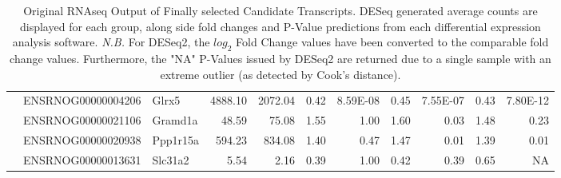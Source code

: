 \begin{sidewaystable}[]
\begin{tabular}{lllrrrrrrrr}
& ENSRNOG00000004206 & Glrx5             & 4888.10               & 2072.04               & 0.42        & 8.59E-08         & 0.45          & 7.55E-07           & 0.43           & 7.80E-12           \\
& ENSRNOG00000021106 & Gramd1a           & 48.59                 & 75.08                 & 1.55        & 1.00             & 1.60          & 0.03               & 1.48           & 0.23               \\
& ENSRNOG00000020938 & Ppp1r15a          & 594.23                & 834.08                & 1.40        & 0.47             & 1.47          & 0.01               & 1.39           & 0.01               \\
& ENSRNOG00000013631 & Slc31a2           & 5.54                  & 2.16                  & 0.39        & 1.00             & 0.42          & 0.39               & 0.65           & NA                
\end{tabular}
\caption[Original RNAseq Output of Finally selected Candidate Transcripts]{Original RNAseq Output of Finally selected Candidate Transcripts. DESeq generated average counts are displayed for each group, along side fold changes and P-Value predictions from each differential expression analysis software. \textit{N.B.} For DESeq2, the $log_{2}$ Fold Change values have been converted to the comparable fold change values. Furthermore, the "NA" P-Values issued by DESeq2 are returned due to a single sample with an extreme outlier (as detected by Cook's distance).}
\label{tab:candidatelistRNAseq}
\end{sidewaystable}









